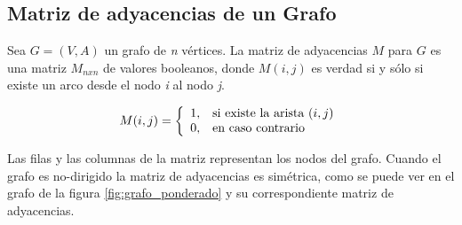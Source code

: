       \subsection{Matriz de adyacencias de un Grafo} %
      \label{sub:matriz_de_adyacencias_de_un_grafo}
        Sea $G = (V,A)$ un grafo de \emph{n} vértices. La matriz de adyacencias $M$  para $G$ es una matriz $M_{nxn}$ de valores booleanos, donde $M(i,j)$ es verdad si y sólo si existe un arco desde el nodo \emph{i} al nodo \emph{j}.

        \begin{displaymath}
          M(i,j) = \left\{
          \begin{array}{ l l }
            1, & \textrm{si existe la arista } (i,j) \\
            0, & \textrm{en caso contrario}
          \end{array} \right.
        \end{displaymath}


        Las filas y las columnas de la matriz representan los nodos del grafo.
        Cuando el grafo es no-dirigido la matriz de adyacencias es simétrica, como se puede ver en el grafo de la figura \ref{fig:grafo_ponderado} y su correspondiente matriz de adyacencias.


